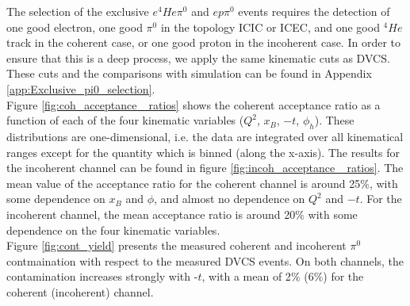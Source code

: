The selection of the exclusive $e^{4}He\pi^{0}$ and $ep\pi^{0}$ events requires 
the detection of one good electron, one good $\pi^{0}$ in the topology ICIC or 
ICEC, and one good $^{4}He$ track in the coherent case, or one good proton in 
the incoherent case. In order to ensure that this is a deep process, we apply 
the same kinematic cuts as DVCS. These cuts and the comparisons with simulation 
can be found in Appendix \ref{app:Exclusive_pi0_selection}.\\


Figure \ref{fig:coh_acceptance _ratios} shows the coherent acceptance ratio as 
a function of each of the four kinematic variables ($Q^{2}$, $x_{B}$, $-t$, 
$\phi_{h}$). These distributions are one-dimensional, i.e. the data are 
integrated over all kinematical ranges except for the quantity which is binned 
(along the x-axis). The results for the incoherent channel can be found in 
figure \ref{fig:incoh_acceptance _ratios}. The mean value of the acceptance 
ratio for the coherent channel is around 25$\%$, with some dependence on 
$x_{B}$ and $\phi$, and almost no dependence on $Q^{2}$ and $-t$. For the 
incoherent channel, the mean acceptance ratio is around 20$\%$ with some 
dependence on the four kinematic variables.\\

Figure \ref{fig:cont_yield} presents the measured coherent and incoherent 
$\pi^{0}$ contmaination with respect to the measured DVCS events. On both 
channels, the contamination increases strongly with -$t$, with a mean of 2$\%$ 
(6$\%$) for the coherent (incoherent) channel. \\


